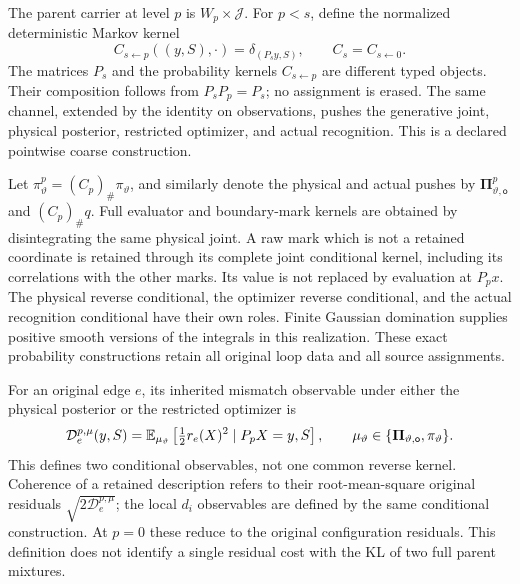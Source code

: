 The parent carrier at level \(p\) is \(W_p\times\mathcal J\).
For \(p<s\), define the normalized deterministic Markov kernel
\begin{equation}
C_{s\leftarrow p}((y,S),\cdot)=\delta_{(P_sy,S)},
\qquad C_s=C_{s\leftarrow0}.
\label{eq:rg-formation-marked-channel}
\end{equation}
The matrices \(P_s\) and the probability kernels \(C_{s\leftarrow p}\)
are different typed objects. Their composition follows from
\(P_sP_p=P_s\); no assignment is erased. The same channel, extended
by the identity on observations, pushes the generative joint, physical
posterior, restricted optimizer, and actual recognition. This is a
declared pointwise coarse construction. 

Let \(\pi_\vartheta^p=(C_p)_\#\pi_\vartheta\), and similarly denote
the physical and actual pushes by
\(\boldsymbol\Pi_{\vartheta,\mathsf o}^p\) and \((C_p)_\#q\).
Full evaluator and boundary-mark kernels are obtained by disintegrating
the same physical joint. A raw mark which is not a retained coordinate
is retained through its complete joint conditional kernel, including
its correlations with the other marks. Its value is not replaced by
evaluation at \(P_px\). The physical reverse conditional, the optimizer
reverse conditional, and the actual recognition conditional have their
own roles. Finite Gaussian domination supplies positive smooth versions
of the integrals in this realization. These exact probability
constructions retain all original loop data and all source assignments.

For an original edge \(e\), its inherited mismatch observable under
either the physical posterior or the restricted optimizer is
\begin{equation}
\mathcal D_e^{p,\mu}(y,S)
=\mathbb E_{\mu_\vartheta}
 \left[\tfrac12r_e(X)^2\mid P_pX=y,S\right],
\qquad
\mu_\vartheta\in
\{\boldsymbol\Pi_{\vartheta,\mathsf o},\pi_\vartheta\}.
\label{eq:rg-formation-inherited-edge-statistic}
\end{equation}
This defines two conditional observables, not one common reverse
kernel. Coherence of a retained description refers to their
root-mean-square original residuals
\(\sqrt{2\mathcal D_e^{p,\mu}}\); the local \(d_i\) observables
are defined by the same conditional construction. At \(p=0\) these
reduce to the original configuration residuals. This definition does
not identify a single residual cost with the KL of two full parent
mixtures. 


